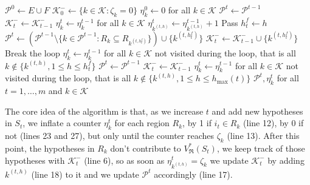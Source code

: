 \documentclass[
  11pt,
  a4paper,
]{article}
\theoremstyle{plain}
\theoremstyle{plain}
\theoremstyle{definition}
\theoremstyle{plain}
\theoremstyle{definition}
\theoremstyle{remark}
\begin{document}
\begin{algorithm}[htb!]
\caption{\label{algo-formal-curve}Formal computation of $(V^*_{\mathfrak{R}}(S_t))_{0\leq t\leq m}$ with a complete family}
\begin{algorithmic}[1]
  \State $\mathcal{P}^0\gets E\cup F$  
  \State $\mathcal{K}^-_0\gets\{k\in\mathcal{K} : \zeta_k=0  \}$
  \State $\eta^0_k\gets0$ for all $k\in\mathcal{K}$
      \State $\mathcal{P}^t \gets \mathcal{P}^{t-1}$
      \State $\mathcal{K}^-_t \gets \mathcal{K}^-_{t-1}$
      \State $\eta^t_k\gets\eta^{t-1}_k$ for all $k\in\mathcal{K}$
    \Else
        \State $\eta^t_{k^{(t,h)}}\gets\eta^{t-1}_{k^{(t,h)}} + 1$
          \State Pass
        \Else
          \State $h^f_t \gets h$ 
          \State $\mathcal{P}^t \gets\left( \mathcal{P}^{t-1}\setminus \{ k\in \mathcal{P}^{t-1} : R_k\subseteq R_{k^{(t,h^f_t)}} \}\right)\cup \{ k^{(t,h^f_t)} \}$
          \State $\mathcal{K}^-_t \gets \mathcal{K}^-_{t-1} \cup \{k^{(t,h^f_t)}\}$
          \State Break the loop
        \EndIf
      \EndFor
        \State $\eta^t_k\gets\eta^{t-1}_k$ for all $k\in\mathcal{K}$ not visited during the loop, that is all $k\not\in\{k^{(t,h)}, 1\leq h\leq h^f_t   \}$
      \Else
        \State $\mathcal{P}^t \gets \mathcal{P}^{t-1}$
        \State $\mathcal{K}^-_t \gets \mathcal{K}^-_{t-1}$
        \State $\eta^t_k\gets\eta^{t-1}_k$ for all $k\in\mathcal{K}$ not visited during the loop, that is all $k\not\in\{k^{(t,h)}, 1\leq h\leq h_{\max}(t)   \}$
      \EndIf
    \EndIf
  \EndFor
  \State\Return $\mathcal{P}^t, \eta^t_k$ for all $t=1,\dotsc, m$ and $k\in\mathcal{K}$
\EndProcedure
\end{algorithmic}
\end{algorithm}

The core idea of the algorithm is that, as we increase \(t\) and add new
hypotheses in \(S_t\), we inflate a counter \(\eta_k^t\) for each region
\(R_k\), by 1 if \(i_t\in R_k\) (line 12), by 0 if not (lines 23 and
27), but only until the counter reaches \(\zeta_k\) (line 13). After
this point, the hypotheses in \(R_k\) don't contribute to
\(V^*_{\mathfrak{R}}(S_t)\), we keep track of those hypotheses with
\(\mathcal{K}^-_t\) (line 6), so as soon as
\(\eta^t_{k^{(t,h)}}=\zeta_k\) we update \(\mathcal{K}^-_t\) by adding
\(k^{(t,h)}\) (line 18) to it and we update \(\mathcal{P}^t\)
accordingly (line 17).
\end{document}
